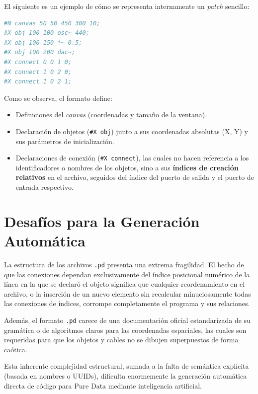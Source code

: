 El siguiente es un ejemplo de cómo se representa internamente un \textit{patch} sencillo:

\begin{lstlisting}[language=bash, caption={Contenido en texto plano de un archivo \texttt{.pd}.}]
#N canvas 50 50 450 300 10;
#X obj 100 100 osc~ 440;
#X obj 100 150 *~ 0.5;
#X obj 100 200 dac~;
#X connect 0 0 1 0;
#X connect 1 0 2 0;
#X connect 1 0 2 1;
\end{lstlisting}

Como se observa, el formato define:
\begin{itemize}
    \item Definiciones del \textit{canvas} (coordenadas y tamaño de la ventana).
    \item Declaración de objetos (\verb|#X obj|) junto a sus coordenadas absolutas (X, Y) y sus parámetros de inicialización.
    \item Declaraciones de conexión (\verb|#X connect|), las cuales no hacen referencia a los identificadores o nombres de los objetos, sino a sus \textbf{índices de creación relativos} en el archivo, seguidos del índice del puerto de salida y el puerto de entrada respectivo.
\end{itemize}

\section{Desafíos para la Generación Automática}

La estructura de los archivos \texttt{.pd} presenta una extrema fragilidad. El hecho de que las conexiones dependan exclusivamente del índice posicional numérico de la línea en la que se declaró el objeto significa que cualquier reordenamiento en el archivo, o la inserción de un nuevo elemento sin recalcular minuciosamente todas las conexiones de índices, corrompe completamente el programa y sus relaciones.

Además, el formato \texttt{.pd} carece de una documentación oficial estandarizada de su gramática o de algoritmos claros para las coordenadas espaciales, las cuales son requeridas para que los objetos y cables no se dibujen superpuestos de forma caótica.

Esta inherente complejidad estructural, sumada a la falta de semántica explícita (basada en nombres o UUIDs), dificulta enormemente la generación automática directa de código para Pure Data mediante inteligencia artificial. 
